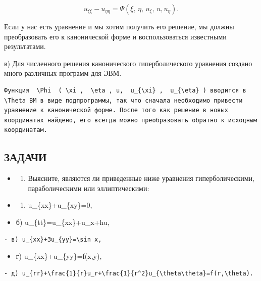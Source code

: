\documentclass[
  ukrainian,
]{article}
\providecommand{\tightlist}{%
  \setlength{\itemsep}{0pt}\setlength{\parskip}{0pt}}
\begin{document}
\[
u_{\xi\xi} - u_{\eta\eta} = \Psi(\xi, \, \eta, \, u_{\xi}, \, u, u_{\eta}).
\]

Если у нас есть уравнение и мы хотим получить его решение, мы должны
преобразовать его к канонической форме и воспользоваться известными
результатами.

в) Для численного решения канонического гиперболического уравнения
создано много различных программ для ЭВМ.

\begin{verbatim}
Функция  \Phi  ( \xi ,  \eta , u,  u_{\xi} ,  u_{\eta} ) вводится в  \Theta ВМ в виде подпрограммы, так что сначала необходимо привести уравнение к канонической форме. После того как решение в новых координатах найдено, его всегда можно преобразовать обратно к исходным координатам.
\end{verbatim}

\subsection{ЗАДАЧИ}\label{ux437ux430ux434ux430ux447ux438-3}

\begin{itemize}
\tightlist
\item
  \begin{enumerate}
  \def\labelenumi{\arabic{enumi}.}
  \tightlist
  \item
    Выясните, являются ли приведенные ниже уравнения гиперболическими,
    параболическими или эллиптическими:
  \end{enumerate}
\item
  \begin{enumerate}
  \def\labelenumi{\alph{enumi})}
  \tightlist
  \item
    u\_\{xx\}+u\_\{xy\}=0,
  \end{enumerate}
\item
  б) u\_\{tt\}=u\_\{xx\}+u\_x+hu,
\end{itemize}

\begin{verbatim}
- в) u_{xx}+3u_{yy}=\sin x,
\end{verbatim}

\begin{itemize}
\tightlist
\item
  г) u\_\{xx\}+u\_\{yy\}=f(x,y),
\end{itemize}

\begin{verbatim}
- д) u_{rr}+\frac{1}{r}u_r+\frac{1}{r^2}u_{\theta\theta}=f(r,\theta).
\end{verbatim}
\end{document}
